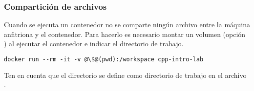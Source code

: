 \subsubsection{Compartición de archivos}

Cuando se ejecuta un contenedor no se comparte ningún archivo entre la máquina
anfitriona y el contenedor. Para hacerlo es necesario montar un volumen (opción
) al ejecutar el contenedor e indicar el directorio de trabajo.

\begin{lstlisting}[style=terminal,escapechar=@]
docker run --rm -it -v @\$@(pwd):/workspace cpp-intro-lab
\end{lstlisting}

Ten en cuenta que el directorio  se define como directorio
de trabajo en el archivo .
